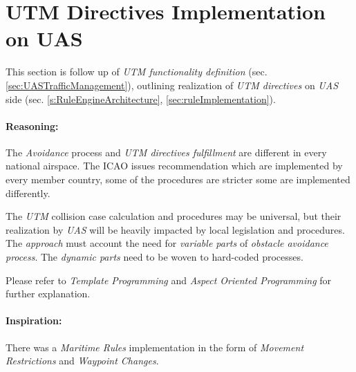 \cleardoublepage
\section{UTM Directives Implementation on UAS}\label{sec:ruleEngine}

\noindent This section is follow up of \emph{UTM functionality definition} (sec. \ref{sec:UASTrafficManagement}), outlining realization of \emph{UTM directives} on \emph{UAS} side (sec. \ref{s:RuleEngineArchitecture},  \ref{sec:ruleImplementation}).

\paragraph{Reasoning:} The \emph{Avoidance} process and \emph{UTM directives fulfillment} are different in every national airspace. The ICAO issues recommendation \cite{icao4444,icaoAnnex2} which are implemented by every member country, some of the procedures are stricter some are implemented differently.

The \emph{UTM} collision case calculation and procedures may be universal, but their realization by \emph{UAS} will be heavily impacted by local legislation and procedures.  The \emph{approach} must account the need for \emph{variable parts} of \emph{obstacle avoidance process}. The \emph{dynamic parts} need to be woven to hard-coded processes. 

\begin{note}
	Please refer to \emph{Template Programming} and \emph{Aspect Oriented Programming} for further explanation.
\end{note}

\paragraph{Inspiration:} There was a \emph{Maritime Rules} implementation \cite{benjamin2006navigation} in the form of \emph{Movement Restrictions} and \emph{Waypoint Changes}.
